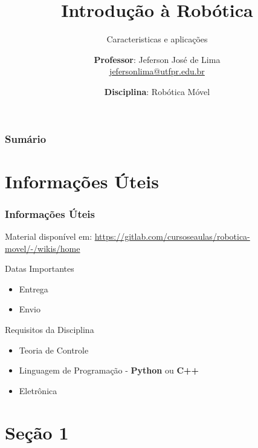 \documentclass[t]{beamer}
\title[\textit{Introdução à robótica móvel}]{
  Introdução à Robótica}
\subtitle{Caracteristicas e aplicações}
\author[Professor: Jeferson José de Lima]{
  \textbf{Professor}: Jeferson José de Lima \\\medskip
  {\small \url{jefersonlima@utfpr.edu.br}}}
\institute[UTFPR-PB]{
  Departamento de Informática (DAINF)}
\date[2017.1]{\textbf{Disciplina}: Robótica Móvel}
\newcommand{\pausar}{\pause}
\begin{document}
\begin{frame}
  \titlepage
\end{frame}

\begin{frame}
	\frametitle{Sumário}
	{\small {\small \tableofcontents}}
\end{frame}


\section{Informações Úteis}
\begin{frame} 
	\frametitle{Informações Úteis}
	\begin{block}{Material disponível em:}
		\href{Robótica Móvel - Wiki}{https://gitlab.com/cursoseaulas/robotica-movel/-/wikis/home}
	\end{block}
	\pausar
	\begin{alertblock}{Datas Importantes}
		\begin{itemize}
		\item Entrega
		\item Envio
		\end{itemize}
	\end{alertblock}
	\pausar
	\begin{exampleblock}{Requisitos da Disciplina}
		\begin{itemize}
		\item Teoria de Controle
		\item Linguagem de Programação - \textbf{Python} ou \textbf{C++}
		\item Eletrônica
		\end{itemize}
	\end{exampleblock}
\end{frame}

\section{Seção 1}
\begin{frame}

\end{frame}
\end{document}
